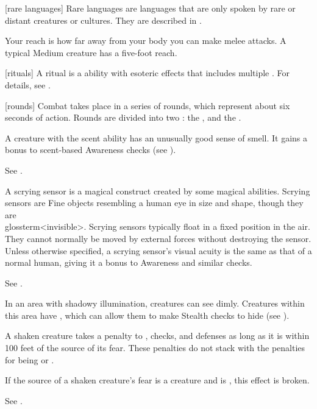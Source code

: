 [rare languages] Rare languages are languages that are only spoken by rare or distant creatures or cultures.
They are described in .

 Your reach is how far away from your body you can make melee attacks.
A typical Medium creature has a five-foot reach.

[rituals] A ritual is a  ability with esoteric effects that includes multiple .
For details, see .

[rounds] Combat takes place in a series of rounds, which represent about six seconds of action.
Rounds are divided into two : the , and the .

 A creature with the scent ability has an unusually good sense of smell.
It gains a  bonus to scent-based Awareness checks (see ).

 See .

 A scrying sensor is a magical construct created by some magical abilities.
Scrying sensors are Fine objects resembling a human eye in size and shape, though they are \\glossterm<invisible>.
Scrying sensors typically float in a fixed position in the air.
They cannot normally be moved by external forces without destroying the sensor.
Unless otherwise specified, a scrying sensor's visual acuity is the same as that of a normal human, giving it a  bonus to Awareness and similar checks.

 See .

 In an area with shadowy illumination, creatures can see dimly.
Creatures within this area have \concealment, which can allow them to make Stealth checks to hide (see ).

 A shaken creature takes a  penalty to , checks, and defenses as long as it is within 100 feet of the source of its fear.
These penalties do not stack with the penalties for being \frightened or \panicked.

If the source of a shaken creature's fear is a creature and is , this effect is broken.

 See .

